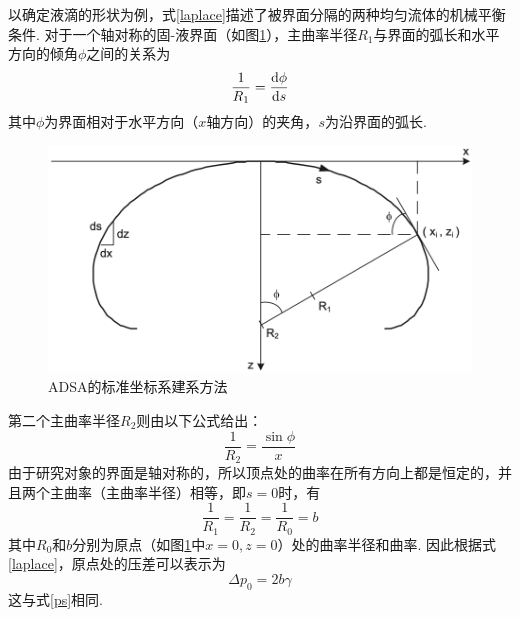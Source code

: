 \documentclass[a4paper,12pt]{article}%
\newcommand{\suo}{\indent}%
\begin{document}
\begin{spacing}{1.528}
以确定液滴的形状为例，式\eqref{laplace}描述了被界面分隔的两种均匀流体的机械平衡条件. 对于一个轴对称的固-液界面（如图\ref{ADSA}），主曲率半径$R_1$与界面的弧长和水平方向的倾角$\phi$之间的关系为
\begin{equation}
    \frac{1}{R_1}=\frac{\text d\phi}{\text ds}\label{r1}
\end{equation}
其中$\phi$为界面相对于水平方向（$x$轴方向）的夹角，$s$为沿界面的弧长. 
\begin{figure}[H]
    \centering
    \includegraphics[scale=0.38]{图像/ADSA.png}
    \caption{ADSA的标准坐标系建系方法}\label{ADSA}
\end{figure}
第二个主曲率半径$R_2$则由以下公式给出：
\begin{equation}
    \frac{1}{R_2}=\frac{\sin\phi}{x}\label{r2}
\end{equation}
\suo 由于研究对象的界面是轴对称的，所以顶点处的曲率在所有方向上都是恒定的，并且两个主曲率（主曲率半径）相等，即$s=0$时，有
\begin{equation}
    \frac{1}{R_1}=\frac{1}{R_2}=\frac{1}{R_0}=b
\end{equation}
其中$R_0$和$b$分别为原点（如图\ref{ADSA}中$x=0,z=0$）处的曲率半径和曲率. 因此根据式\eqref{laplace}，原点处的压差可以表示为
\begin{equation}
    \Delta p_0=2b\gamma\label{p0}
\end{equation}
这与式\eqref{ps}相同. 


\end{spacing}
\end{document}
